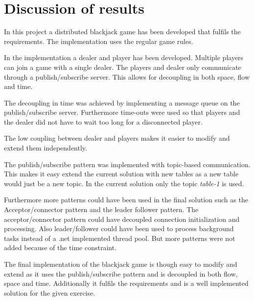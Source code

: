 \chapter{Discussion of results}
In this project a distributed blackjack game has been developed that fulfils the requirements. The implementation uses the regular game rules.

In the implementation a dealer and player has been developed. Multiple players can join a game with a single dealer. The players and dealer only communicate through a publish/subscribe server. This allows for decoupling in both space, flow and time.

The decoupling in time was achieved by implementing a message queue on the publish/subscribe server. Furthermore time-outs were used so that players and the dealer did not have to wait too long for a disconnected player.

The low coupling between dealer and players makes it easier to modify and extend them independently. 

The publish/subscribe pattern was implemented with topic-based communication. This makes it easy extend the current solution with new tables as a new table would just be a new topic. In the current solution only the topic \emph{table-1} is used.

Furthermore more patterns could have been used in the final solution such as the Acceptor/connector pattern and the leader follower pattern. The acceptor/connector pattern could have decoupled connection initialization and processing. Also leader/follower could have been used to process background tasks instead of a .net implemented thread pool. But more patterns were not added because of the time constraint. 

The final implementation of the blackjack game is though easy to modify and extend as it uses the publish/subscribe pattern and is decoupled in both flow, space and time. Additionally it fulfils the requirements and is a well implemented solution for the given exercise.
 